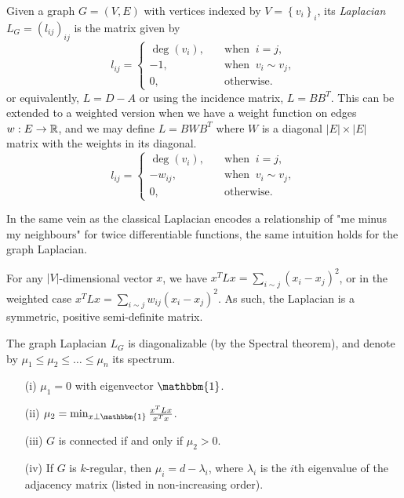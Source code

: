 \documentclass[12pt]{article}
\begin{document}
\begin{definition}
    Given a graph $G=(V,E)$ with vertices indexed by $V = \left\{v_i\right\}_i$, its \emph{Laplacian} $L_G = (l_{ij})_{ij}$ is the matrix given by
    \begin{equation*}
        l_{ij} = \begin{cases}
            \deg(v_i), \quad &\text{when }\: i = j, \\
            -1, \quad &\text{when }\: v_i \sim v_j, \\
            0, \quad &\text{otherwise.}    
        \end{cases}
    \end{equation*}
    or equivalently, $L = D - A$ or using the incidence matrix, $L = BB^T$. This can be extended to a weighted version when we have a weight function on edges $w: E \rightarrow \mathbb{R}$, and we may define $L = BWB^T$ where $W$ is a diagonal $\left|E\right|\times \left|E\right|$ matrix with the weights in its diagonal.
    \begin{equation}\label{wlaplacian}
        l_{ij} = \begin{cases}
            \deg(v_i), \quad &\text{when }\: i = j, \\
            -w_{ij}, \quad &\text{when }\: v_i \sim v_j, \\
            0, \quad &\text{otherwise.}    
        \end{cases}
    \end{equation}
\end{definition}

In the same vein as the classical Laplacian encodes a relationship of "me minus my neighbours" for twice differentiable functions, the same intuition holds for the graph Laplacian.

\begin{prop} For any $\left|V\right|$-dimensional vector $x$, we have $x^TLx = \sum_{i\sim j}{\left(x_i - x_j\right)^2}$, or in the weighted case $x^TLx = \sum_{i\sim j}{w_{ij}\left(x_i - x_j\right)^2}$. As such, the Laplacian is a symmetric, positive semi-definite matrix.
\end{prop}

\begin{prop}
    The graph Laplacian $L_G$ is diagonalizable (by the Spectral theorem), and denote by $\mu_1 \le \mu_2 \le \dots \le \mu_n$ its spectrum.
    \begin{enumerate}
        \item[(i)] $\mu_1 = 0$ with eigenvector $\mathbbm{1}$.
        \item[(ii)] $\mu_2 = \min_{x\perp \mathbbm{1}}{\frac{x^TLx}{x^Tx}}$.
        \item[(iii)] $G$ is connected if and only if $\mu_2 > 0$.
        \item[(iv)] If $G$ is $k$-regular, then $\mu_i = d- \lambda_i$, where $\lambda_i$ is the $i$th eigenvalue of the adjacency matrix (listed in non-increasing order).
    \end{enumerate}
\end{prop}
\end{document}
